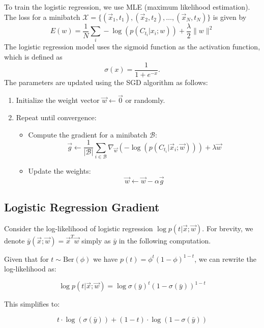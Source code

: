 \documentclass[11pt]{article}
\begin{document}
To train the logistic regression, we use MLE (maximum likelihood estimation). The loss for a minibatch $\mathcal{X} = \{(\vec{x}_1, t_1), (\vec{x}_2, t_2), \ldots, (\vec{x}_N, t_N)\}$ is given by
$$
E({w}) = \frac{1}{N} \sum_{i} -\log(p(C_{t_i} | {x}_i; {w})) + \frac{\lambda}{2} \| {w} \|^2
$$
The logistic regression model uses the sigmoid function as the activation function, which is defined as
$$
\sigma(x) = \frac{1}{1 + e^{-x}}.
$$
The parameters are updated using the SGD algorithm as follows:
\begin{enumerate}
  \item Initialize the weight vector $\vec{w} \leftarrow \vec{0}$ or randomly.
  \item Repeat until convergence:
  \begin{itemize}
    \item Compute the gradient for a minibatch $\mathcal{B}$:
    $$
    \vec{g} \leftarrow \frac{1}{|\mathcal{B}|} \sum_{i \in \mathcal{B}} \nabla_{\vec{w}} \left(-\log(p(C_{t_i} | \vec{x}_i; \vec{w}))\right) + \lambda \vec{w}
    $$
    \item Update the weights:
    $$
    \vec{w} \leftarrow \vec{w} - \alpha \vec{g}
    $$
  \end{itemize}
\end{enumerate}

\subsection*{Logistic Regression Gradient}
Consider the log-likelihood of logistic regression $\log p(t|\vec{x}; \vec{w})$. For brevity, we denote $\bar{y}(\vec{x}; \vec{w}) = \vec{x}^T \vec{w}$ simply as $\bar{y}$ in the following computation.

Given that for $t \sim \text{Ber}(\phi)$ we have $p(t) = \phi^t (1-\phi)^{1-t}$, we can rewrite the log-likelihood as:

\[
\log p(t|\vec{x}; \vec{w}) = \log \sigma(\bar{y})^t (1 - \sigma(\bar{y}))^{1-t}
\]

This simplifies to:

\[
t \cdot \log (\sigma(\bar{y})) + (1 - t) \cdot \log (1 - \sigma(\bar{y}))
\]
\end{document}
